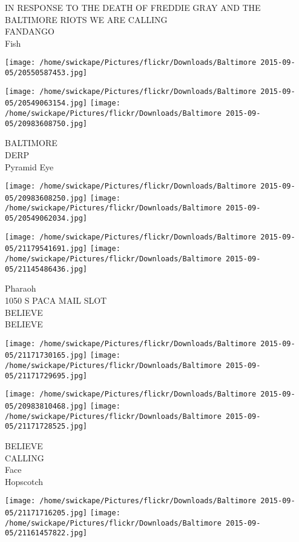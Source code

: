 \documentclass[10pt,letterpaper]{article}
\begin{document}
IN RESPONSE TO THE DEATH OF FREDDIE GRAY AND THE BALTIMORE RIOTS WE ARE CALLING\\
FANDANGO\\
Fish
\pagebreak

\texttt{[image: /home/swickape/Pictures/flickr/Downloads/Baltimore 2015-09-05/20550587453.jpg]}

\vspace{0.25in}
\texttt{[image: /home/swickape/Pictures/flickr/Downloads/Baltimore 2015-09-05/20549063154.jpg]}
\texttt{[image: /home/swickape/Pictures/flickr/Downloads/Baltimore 2015-09-05/20983608750.jpg]}

BALTIMORE\\
DERP\\
Pyramid Eye
\pagebreak

\texttt{[image: /home/swickape/Pictures/flickr/Downloads/Baltimore 2015-09-05/20983608250.jpg]}
\texttt{[image: /home/swickape/Pictures/flickr/Downloads/Baltimore 2015-09-05/20549062034.jpg]}

\texttt{[image: /home/swickape/Pictures/flickr/Downloads/Baltimore 2015-09-05/21179541691.jpg]}
\texttt{[image: /home/swickape/Pictures/flickr/Downloads/Baltimore 2015-09-05/21145486436.jpg]}

Pharaoh\\
1050 S PACA MAIL SLOT\\
BELIEVE\\
BELIEVE
\pagebreak

\texttt{[image: /home/swickape/Pictures/flickr/Downloads/Baltimore 2015-09-05/21171730165.jpg]}
\texttt{[image: /home/swickape/Pictures/flickr/Downloads/Baltimore 2015-09-05/21171729695.jpg]}

\texttt{[image: /home/swickape/Pictures/flickr/Downloads/Baltimore 2015-09-05/20983810468.jpg]}
\texttt{[image: /home/swickape/Pictures/flickr/Downloads/Baltimore 2015-09-05/21171728525.jpg]}

BELIEVE\\
CALLING\\
Face\\
Hopscotch
\pagebreak

\texttt{[image: /home/swickape/Pictures/flickr/Downloads/Baltimore 2015-09-05/21171716205.jpg]}
\texttt{[image: /home/swickape/Pictures/flickr/Downloads/Baltimore 2015-09-05/21161457822.jpg]}
\end{document}
